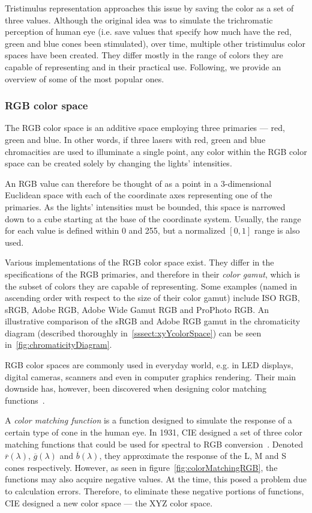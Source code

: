 Tristimulus representation approaches this issue by saving the color as a set of three values. Although the original idea was to simulate the trichromatic perception of human eye (i.e. save values that specify how much have the red, green and blue cones been stimulated), over time, multiple other tristimulus color spaces have been created. They differ mostly in the range of colors they are capable of representing and in their practical use. Following, we provide an overview of some of the most popular ones.

\subsubsection{RGB color space}
The RGB color space is an additive space employing three primaries --- red, green and blue. In other words, if three lasers with red, green and blue chromacities are used to illuminate a single point, any color within the RGB color space can be created solely by changing the lights' intensities. 

An RGB value can therefore be thought of as a point in a 3-dimensional Euclidean space with each of the coordinate axes representing one of the primaries. As the lights' intensities must be bounded, this space is narrowed down to a cube starting at the base of the coordinate system. Usually, the range for each value is defined within 0 and 255, but a normalized $[0,1]$ range is also used.

Various implementations of the RGB color space exist. They differ in the specifications of the RGB primaries, and therefore in their \emph{color gamut}, which is the subset of colors they are capable of representing. Some examples (named in ascending order with respect to the size of their color gamut) include ISO RGB, sRGB, Adobe RGB, Adobe Wide Gamut RGB and ProPhoto RGB. An illustrative comparison of the sRGB and Adobe RGB gamut in the chromaticity diagram (described thoroughly in~\cref{sssect:xyYcolorSpace}) can be seen in~\cref{fig:chromaticityDiagram}.

RGB color spaces are commonly used in everyday world, e.g. in LED displays, digital cameras, scanners and even in computer graphics rendering. Their main downside has, however, been discovered when designing color matching functions~\cite{colorMatchingDerivation}.

A \emph{color matching function} is a function designed to simulate the response of a certain type of cone in the human eye. In 1931, CIE designed a set of three color matching functions that could be used for spectral to RGB conversion~\cite{colorMatchingDerivation}. Denoted $\overline{r}(\lambda)$, $\overline{g}(\lambda)$ and $\overline{b}(\lambda)$, they approximate the response of the L, M and S cones respectively. However, as seen in figure~\cref{fig:colorMatchingRGB}, the functions may also acquire negative values. At the time, this posed a problem due to calculation errors. Therefore, to eliminate these negative portions of functions, CIE designed a new color space --- the XYZ color space.

